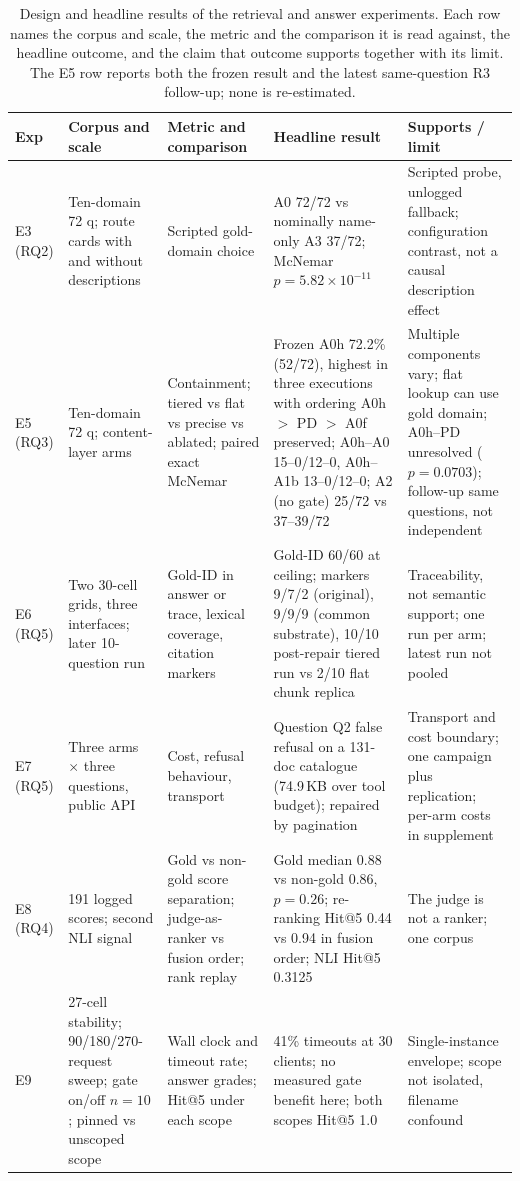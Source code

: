 \documentclass[11pt]{article}
\begin{document}
\begin{table}
\centering
\footnotesize
\setlength{\tabcolsep}{4pt}
\caption{Design and headline results of the retrieval and answer experiments.
Each row names the corpus and scale, the metric and the comparison it is read
against, the headline outcome, and the claim that outcome supports together
with its limit. The E5 row reports both the frozen result and the latest
same-question R3 follow-up; none is re-estimated.}

\begin{tabular}{@{}p{4cm}p{4cm}p{4cm}p{4cm}p{4cm}@{}}
\toprule
Exp & Corpus and scale & Metric and comparison & Headline result & Supports / limit\\
\midrule
E3 (RQ2) & Ten-domain 72 q; route cards with and without descriptions & Scripted gold-domain choice & A0 72/72 vs nominally name-only A3 37/72; McNemar $p=5.82\times10^{-11}$ & Scripted probe, unlogged fallback; configuration contrast, not a causal description effect\\
E5 (RQ3) & Ten-domain 72 q; content-layer arms & Containment; tiered vs flat vs precise vs ablated; paired exact McNemar & Frozen A0h 72.2\% (52/72), highest in three executions with ordering A0h $>$ PD $>$ A0f preserved; A0h--A0 15--0/12--0, A0h--A1b 13--0/12--0; A2 (no gate) 25/72 vs 37--39/72 & Multiple components vary; flat lookup can use gold domain; A0h--PD unresolved ($p=0.0703$); follow-up same questions, not independent\\
E6 (RQ5) & Two 30-cell grids, three interfaces; later 10-question run & Gold-ID in answer or trace, lexical coverage, citation markers & Gold-ID 60/60 at ceiling; markers 9/7/2 (original), 9/9/9 (common substrate), 10/10 post-repair tiered run vs 2/10 flat chunk replica & Traceability, not semantic support; one run per arm; latest run not pooled\\
E7 (RQ5) & Three arms $\times$ three questions, public API & Cost, refusal behaviour, transport & Question Q2 false refusal on a 131-doc catalogue (74.9\,KB over tool budget); repaired by pagination & Transport and cost boundary; one campaign plus replication; per-arm costs in supplement\\
E8 (RQ4) & 191 logged scores; second NLI signal & Gold vs non-gold score separation; judge-as-ranker vs fusion order; rank replay & Gold median 0.88 vs non-gold 0.86, $p=0.26$; re-ranking Hit@5 0.44 vs 0.94 in fusion order; NLI Hit@5 0.3125 & The judge is not a ranker; one corpus\\
E9 & 27-cell stability; 90/180/270-request sweep; gate on/off $n=10$; pinned vs unscoped scope & Wall clock and timeout rate; answer grades; Hit@5 under each scope & 41\% timeouts at 30 clients; no measured gate benefit here; both scopes Hit@5 1.0 & Single-instance envelope; scope not isolated, filename confound\\
\bottomrule
\end{tabular}
\end{table}
\end{document}
